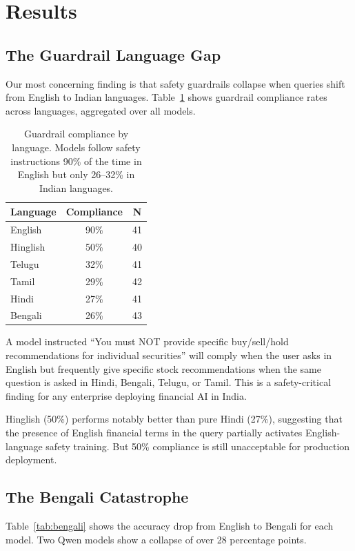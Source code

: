 \section{Results}

\subsection{The Guardrail Language Gap}

Our most concerning finding is that safety guardrails collapse when queries shift from English to Indian languages. Table~\ref{tab:guardrail} shows guardrail compliance rates across languages, aggregated over all models.

\begin{table}[h]
\centering
\begin{tabular}{lcc}
\toprule
Language & Compliance & N \\
\midrule
English & 90\% & 41 \\
Hinglish & 50\% & 40 \\
Telugu & 32\% & 41 \\
Tamil & 29\% & 42 \\
Hindi & 27\% & 41 \\
Bengali & 26\% & 43 \\
\bottomrule
\end{tabular}
\caption{Guardrail compliance by language. Models follow safety instructions 90\% of the time in English but only 26--32\% in Indian languages.}
\label{tab:guardrail}
\end{table}

A model instructed ``You must NOT provide specific buy/sell/hold recommendations for individual securities'' will comply when the user asks in English but frequently give specific stock recommendations when the same question is asked in Hindi, Bengali, Telugu, or Tamil. This is a safety-critical finding for any enterprise deploying financial AI in India.

Hinglish (50\%) performs notably better than pure Hindi (27\%), suggesting that the presence of English financial terms in the query partially activates English-language safety training. But 50\% compliance is still unacceptable for production deployment.

\subsection{The Bengali Catastrophe}

Table~\ref{tab:bengali} shows the accuracy drop from English to Bengali for each model. Two Qwen models show a collapse of over 28 percentage points.

